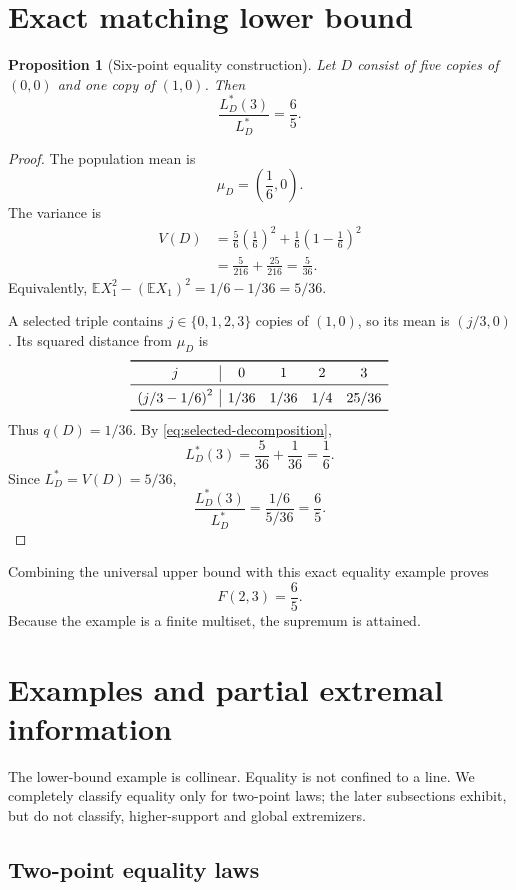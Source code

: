 \documentclass[11pt]{article}
\newtheorem{proposition}[theorem]{Proposition}
\theoremstyle{definition}
\theoremstyle{remark}
\newcommand{\E}{\mathbb{E}}
\begin{document}
\section{Exact matching lower bound}

\begin{proposition}[Six-point equality construction]
Let $D$ consist of five copies of $(0,0)$ and one copy of $(1,0)$.  Then
\[
\frac{L_D^*(3)}{L_D^*}=\frac65.
\]
\end{proposition}

\begin{proof}
The population mean is
\[
\mu_D=\left(\frac16,0\right).
\]
The variance is
\begin{align*}
V(D)
&=\frac56\left(\frac16\right)^2
 +\frac16\left(1-\frac16\right)^2\\
&=\frac5{216}+\frac{25}{216}
=\frac5{36}.
\end{align*}
Equivalently, $\E X_1^2-(\E X_1)^2=1/6-1/36=5/36$.

A selected triple contains $j\in\{0,1,2,3\}$ copies of $(1,0)$, so its mean is $(j/3,0)$.  Its squared distance from $\mu_D$ is
\begin{equation}
\begin{array}{c|cccc}
\toprule
j&0&1&2&3\\
\midrule
\left(j/3-1/6\right)^2&1/36&1/36&1/4&25/36\\
\bottomrule
\end{array}
\label{eq:lower-table}
\end{equation}
Thus $q(D)=1/36$.  By \eqref{eq:selected-decomposition},
\[
L_D^*(3)=\frac5{36}+\frac1{36}=\frac16.
\]
Since $L_D^*=V(D)=5/36$,
\[
\frac{L_D^*(3)}{L_D^*}
=\frac{1/6}{5/36}=\frac65.
\]
\end{proof}

Combining the universal upper bound with this exact equality example proves
\[
\boxed{F(2,3)=\frac65}.
\]
Because the example is a finite multiset, the supremum is attained.

\section{Examples and partial extremal information}

The lower-bound example is collinear.  Equality is not confined to a line.  We completely classify equality only for two-point laws; the later subsections exhibit, but do not classify, higher-support and global extremizers.

\subsection{Two-point equality laws}
\end{document}
